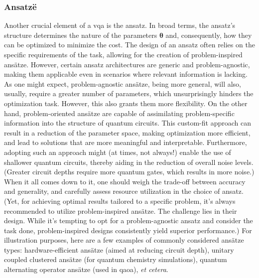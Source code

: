 \subsubsection*{\small Ansatzë}
Another crucial element of a \acrshort{vqa} is the ansatz. In broad terms, the ansatz's structure determines the nature of the parameters $\boldsymbol{\theta}$ and, consequently, how they can be optimized to minimize the cost. The design of an ansatz often relies on the specific requirements of the task, allowing for the creation of problem-inspired ansätze. However, certain ansatz architectures are generic and problem-agnostic, making them applicable even in scenarios where relevant information is lacking. As one might expect, problem-agnostic ansätze, being more general, will also, usually, require a greater number of parameters, which unsurprisingly hinders the optimization task. However, this also grants them more flexibility. On the other hand, problem-oriented ansätze are capable of assimilating problem-specific information into the structure of quantum circuits. This custom-fit approach can result in a reduction of the parameter space, making optimization more efficient, and lead to solutions that are more meaningful and interpretable. Furthermore, adopting such an approach might (at times, not always!) enable the use of shallower quantum circuits, thereby aiding in the reduction of overall noise levels. (Greater circuit depths require more quantum gates, which results in more noise.) When it all comes down to it, one should weigh the trade-off between accuracy and generality, and carefully assess resource utilization in the choice of ansatz. (Yet, for achieving optimal results tailored to a specific problem, it's always recommended to utilize problem-inspired ansätze. The challenge lies in their design. While it's tempting to opt for a problem-agnostic ansatz and consider the task done, problem-inspired designs consistently yield superior performance.) For illustration purposes, here are a few examples of commonly considered ansätze types: hardware-efficient ansätze (aimed at reducing circuit depth), unitary coupled clustered ansätze (for quantum chemistry simulations), quantum alternating operator ansätze (used in \acrshort{qaoa}), \textit{et cetera}.

